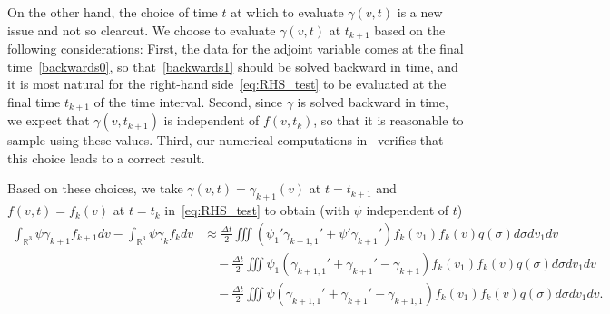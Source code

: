\documentclass[times,final,nopreprintline]{elsarticle}
\newcommand{\bbR}{\mathbb R} \newcommand{\bbS}{\mathbb S}
\newcommand{\Rthree}{{\bbR^3}}
\begin{document}
On the other hand, the choice of time $t$ at which to evaluate $\gamma(v,t)$ is a new issue and not so clearcut.  We choose to evaluate $\gamma(v,t)$  at $t_{k+1}$ based on the following considerations: 
First, the data for the adjoint variable comes at the final time~\eqref{backwards0}, so that~\eqref{backwards1} should be solved backward in time, and it is most natural for the right-hand side~\eqref{eq:RHS_test} to be evaluated at the final time $t_{k+1}$ of the time interval.
Second,  since $\gamma$ is solved backward in time, we expect that 
 $\gamma(v,t_{k+1})$ is independent of $f(v,t_k)$, so that it is reasonable to sample using these values. 
Third, our numerical computations in~ verifies that this choice leads to a correct result. 



Based on these choices, we take  $\gamma(v,t)=\gamma_{k+1}(v)$ at $t=t_{k+1}$ and $f(v,t)=f_k(v)$ at $t=t_k$ in~\eqref{eq:RHS_test} to obtain (with $\psi$ independent of $t$)
\begin{align}
\int_\Rthree \psi \gamma_{k+1} f_{k+1} dv -\int_\Rthree \psi \gamma _k f _k dv 
&\approx\frac{\Delta t}{2} \iiint (\psi_1'\gamma_{k+1,1}' + \psi'\gamma_{k+1}')  f_k(v_1) f_k(v) q(\sigma)d\sigma dv_1 dv  \nonumber \\
 &\quad-\frac{\Delta t}{2}  \iiint  \psi_1(\gamma_{k+1,1}' + \gamma_{k+1}' -\gamma_{k+1}) f_k(v_1) f_k(v) q(\sigma)d\sigma dv_1 dv  \nonumber\\
 &\quad -\frac{\Delta t}{2}  \iiint\psi (\gamma_{k+1,1}' + \gamma_{k+1}' -\gamma_{k+1,1})f_k(v_1) f_k(v) q(\sigma)d\sigma dv_1 dv. \label{eq:OTD_DSMC}
\end{align}
\end{document}
